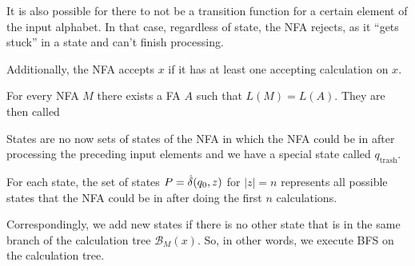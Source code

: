 It is also possible for there to not be a transition function for a certain element of the input alphabet.
In that case, regardless of state, the NFA rejects, as it ``gets stuck'' in a state and can't finish processing.

Additionally, the NFA accepts $x$ if it has at least one accepting calculation on $x$.

\inlinetheorem For every NFA $M$ there exists a FA $A$ such that $L(M) = L(A)$. They are then called 


States are no now sets of states of the NFA in which the NFA could be in after processing the preceding input elements and we have a special state called $q_{\text{trash}}$.

For each state, the set of states $P = \hat{\delta}(q_0, z)$ for $|z| = n$ represents all possible states that the NFA could be in after doing the first $n$ calculations.

Correspondingly, we add new states if there is no other state that is in the same branch of the calculation tree $\mathcal{B}_M(x)$.
So, in other words, we execute BFS on the calculation tree.
